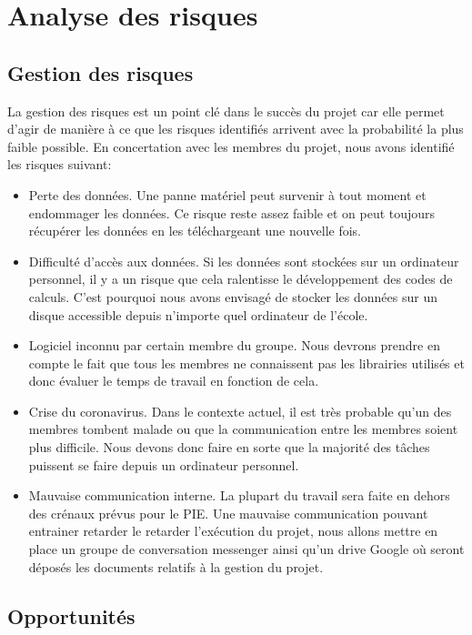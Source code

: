 \chapter*{Analyse des risques}
\label{sec:risques}
\section*{Gestion des risques}
La gestion des risques est un point clé dans le succès du projet car elle permet d'agir de manière à ce que les risques identifiés arrivent avec la probabilité la plus faible possible. En concertation avec les membres du projet, nous avons identifié les risques suivant:

\begin{itemize}
	\item Perte des données. Une panne matériel peut survenir à tout moment et endommager les données. Ce risque reste assez faible et on peut toujours récupérer les données en les téléchargeant une nouvelle fois.
	
	\item Difficulté d'accès aux données. Si les données sont stockées sur un ordinateur personnel, il y a un risque que cela ralentisse le développement des codes de calculs. C'est pourquoi nous avons envisagé de stocker les données sur un disque accessible depuis n'importe quel ordinateur de l'école.
	
	\item Logiciel inconnu par certain membre du groupe. Nous devrons prendre en compte le fait que tous les membres ne connaissent pas les librairies utilisés et donc évaluer le temps de travail en fonction de cela.
	
	\item Crise du coronavirus. Dans le contexte actuel, il est très probable qu'un des membres tombent malade ou que la communication entre les membres soient plus difficile. Nous devons donc faire en sorte que la majorité des tâches puissent se faire depuis un ordinateur personnel.
	
	\item Mauvaise communication interne. La plupart du travail sera faite en dehors des crénaux prévus pour le PIE. Une mauvaise communication pouvant entrainer retarder le retarder l'exécution du projet, nous allons mettre en place un groupe de conversation messenger ainsi qu'un drive Google où seront déposés les documents relatifs à la gestion du projet.
	
\end{itemize}

\section*{Opportunités}

